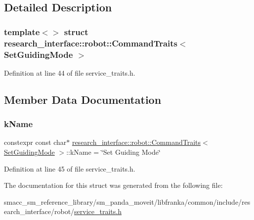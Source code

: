 \subsection{Detailed Description}
\subsubsection*{template$<$$>$\newline
struct research\+\_\+interface\+::robot\+::\+Command\+Traits$<$ Set\+Guiding\+Mode $>$}



Definition at line 44 of file service\+\_\+traits.\+h.



\subsection{Member Data Documentation}
\mbox{\label{structresearch__interface_1_1robot_1_1CommandTraits_3_01SetGuidingMode_01_4_a567f1f1b2f1cfb58e3b87173eb31adeb}} 
\subsubsection{\texorpdfstring{k\+Name}{kName}}
{\footnotesize\ttfamily constexpr const char$\ast$ \hyperlink{structresearch__interface_1_1robot_1_1CommandTraits}{research\+\_\+interface\+::robot\+::\+Command\+Traits}$<$ \hyperlink{structresearch__interface_1_1robot_1_1SetGuidingMode}{Set\+Guiding\+Mode} $>$\+::k\+Name = \char`\"{}Set Guiding Mode\char`\"{}\hspace{0.3cm}{\ttfamily [static]}}



Definition at line 45 of file service\+\_\+traits.\+h.



The documentation for this struct was generated from the following file\+:\begin{DoxyCompactItemize}
\item 
smacc\+\_\+sm\+\_\+reference\+\_\+library/sm\+\_\+panda\+\_\+moveit/libfranka/common/include/research\+\_\+interface/robot/\hyperlink{service__traits_8h}{service\+\_\+traits.\+h}\end{DoxyCompactItemize}
